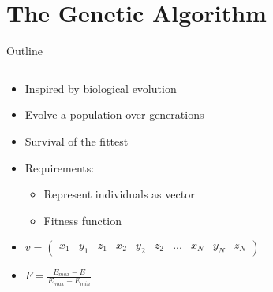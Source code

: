 \documentclass[10pt]{beamer}
\begin{document}
\section{The Genetic Algorithm}

{%
\begin{frame}{Outline}
	\begin{columns}[c] %
		\begin{column}{.48\textwidth}
			\begin{itemize}
				\item {Inspired by biological evolution}
				\item {Evolve a population over generations}
				\item {Survival of the fittest}
				\item {Requirements:}
				\begin{itemize}
					\item {Represent individuals as vector}
					\item {Fitness function}
				\end{itemize}
				\item{$v = \left(\begin{smallmatrix}
					x_1 & y_1 & z_1 & x_2 &  y_2 & z_2 &
					... & x_N & y_N & z_N
					\end{smallmatrix}\right)$}
				\item{$F = \frac{E_{max} - E}{E_{max} - E_{min}}$}
			\end{itemize}


\end{column}
\end{columns}
\end{frame}}
\end{document}
